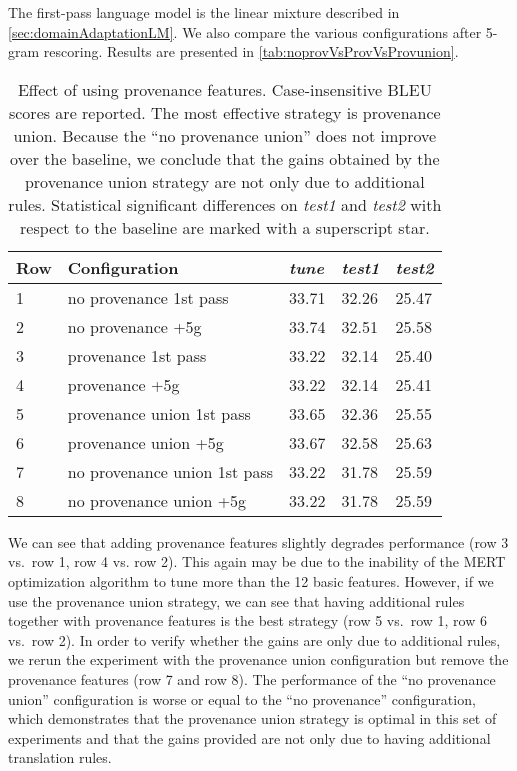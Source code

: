 The first-pass language model is the linear mixture described
in \autoref{sec:domainAdaptationLM}. We also compare
the various configurations after 5-gram rescoring.
Results are presented in \autoref{tab:noprovVsProvVsProvunion}.
%
\begin{table}
  \begin{center}
    \begin{tabular}{l|l|lll}
      Row & Configuration & \emph{tune} & \emph{test1} & \emph{test2} \\
      \hline
      1 & no provenance 1st pass & 33.71 & 32.26 & 25.47 \\
      2 & no provenance +5g           & 33.74 & 32.51 & 25.58 \\
      \hline
      3 & provenance 1st pass & 33.22 & 32.14 & 25.40 \\
      4 & provenance +5g        & 33.22 & 32.14 & 25.41 \\
      \hline
      5 & provenance union 1st pass & 33.65 & 32.36 & 25.55 \\
      6 & provenance union +5g              & 33.67 & 32.58 & 25.63 \\
      \hline
      7 & no provenance union 1st pass & 33.22 & 31.78 & 25.59 \\
      8 & no provenance union +5g      & 33.22 & 31.78 & 25.59 \\
    \end{tabular}
    \caption{Effect of using provenance features. Case-insensitive
      BLEU scores are reported. The most effective strategy is
      provenance union. Because the ``no provenance union'' does
      not improve over the baseline, we conclude that the gains
      obtained by the provenance union strategy are not only due
      to additional rules. Statistical significant differences on \emph{test1}
      and \emph{test2} with respect to the baseline are marked
      with a superscript star.}
    \label{tab:noprovVsProvVsProvunion}
  \end{center}
\end{table}
%
We can see that adding provenance features slightly degrades
performance (row 3 vs.\ row 1, row 4 vs. row 2). This again
may be due to the inability of the MERT optimization algorithm to
tune more than the 12 basic features.
However, if we use the provenance union strategy, we can see that having additional
rules together with provenance features is the best
strategy (row 5 vs.\ row 1, row 6 vs.\ row 2).
In order to verify whether the gains are only due to additional
rules, we rerun the experiment with the provenance union configuration but
remove the provenance
features (row 7 and row 8). The performance of the ``no provenance union''
configuration is worse or equal to the ``no provenance'' configuration, which
demonstrates that the provenance union strategy is optimal in this set of experiments
and that the gains provided are not only due to having additional translation
rules.

